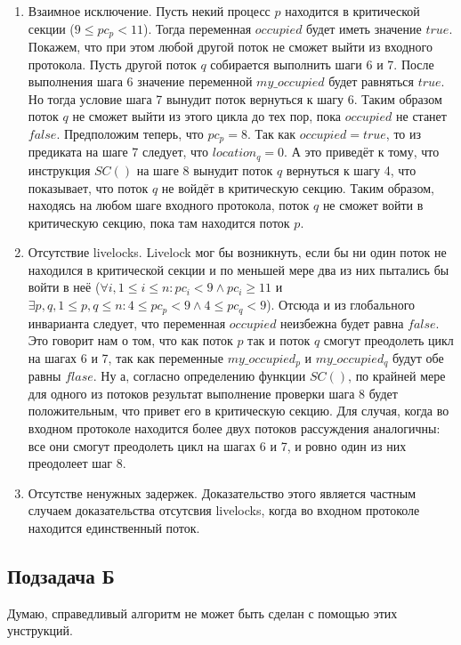\documentclass{article}
\begin{document}
\begin{enumerate}
\item Взаимное исключение. Пусть некий процесс $ p $ находится в критической секции ($ 9 \leq pc_p < 11 $). Тогда переменная
      $ occupied $ будет иметь значение $ true $. Покажем, что при этом любой другой поток не сможет выйти из входного протокола.
      Пусть другой поток $ q $ собирается выполнить шаги 6 и 7. После выполнения шага 6 значение переменной $ my\_occupied $
      будет равняться $ true $. Но тогда условие шага 7 вынудит поток вернуться к шагу 6. Таким образом поток $ q $ не сможет
      выйти из этого цикла до тех пор, пока $ occupied $ не станет $ false $. Предположим теперь, что $ pc_p = 8 $. Так как
      $ occupied = true $, то из предиката на шаге 7 следует, что $ location_q = 0 $. А это приведёт к тому, что инструкция
      $ SC() $ на шаге 8 вынудит поток $ q $ вернуться к шагу 4, что показывает, что поток $ q $ не войдёт в критическую секцию.
      Таким образом, находясь на любом шаге входного протокола, поток $ q $ не сможет войти в критическую секцию, пока там 
      находится поток $ p $.
\item Отсутствие livelocks. Livelock мог бы возникнуть, если бы ни один поток не находился в критической секции и по меньшей мере
      два из них пытались бы войти в неё ($ \forall i, 1 \leq i \leq n : pc_i < 9 \land pc_i \geq 11 $ и $ \exists p,q, 1 \leq
      p,q \leq n : 4 \leq pc_p < 9 \land 4 \leq pc_q < 9 $). Отсюда и из глобального инварианта следует, что переменная $ occupied
      $ неизбежна будет равна $ false $. Это говорит нам о том, что как поток $ p $ так и поток $ q $ смогут преодолеть цикл на
      шагах 6 и 7, так как переменные $ my\_occupied_p $ и $ my\_occupied_q $ будут обе равны $ flase $. Ну а, согласно определению
      функции $ SC() $, по крайней мере для одного из потоков результат выполнение проверки шага 8 будет положительным, что
      привет его в критическую секцию. Для случая, когда во входном протоколе находится более двух потоков рассуждения аналогичны:
      все они смогут преодолеть цикл на шагах 6 и 7, и ровно один из них преодолеет шаг 8.
\item Отсутстве ненужных задержек. Доказательство этого является частным случаем доказательства отсутсвия livelocks, когда во
      входном протоколе находится единственный поток.
\end{enumerate}

\subsection{Подзадача Б}

Думаю, справедливый алгоритм не может быть сделан с помощью этих унструкций.
\end{document}
